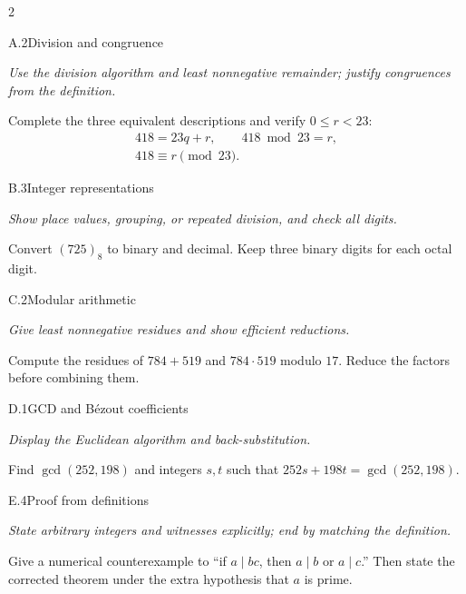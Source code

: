 \documentclass[9pt]{extarticle}
\begin{document}
\begin{multicols}{2}
\begin{CoreProblem}{A.2}{Division and congruence}
{\scriptsize\textit{Use the division algorithm and least nonnegative remainder; justify congruences from the definition.}\par}
Complete the three equivalent descriptions and verify $0\le r<23$:
\[
\begin{gathered}
418=23q+r,\qquad 418\bmod 23=r,\\
418\equiv r\pmod{23}.
\end{gathered}
\]
\end{CoreProblem}
\begin{CoreProblem}{B.3}{Integer representations}
{\scriptsize\textit{Show place values, grouping, or repeated division, and check all digits.}\par}
Convert $(725)_8$ to binary and decimal. Keep three binary digits for each
octal digit.
\end{CoreProblem}
\begin{CoreProblem}{C.2}{Modular arithmetic}
{\scriptsize\textit{Give least nonnegative residues and show efficient reductions.}\par}
Compute the residues of $784+519$ and $784\cdot519$ modulo $17$. Reduce the
factors before combining them.
\end{CoreProblem}
\columnbreak
\begin{CoreProblem}{D.1}{GCD and B\'ezout coefficients}
{\scriptsize\textit{Display the Euclidean algorithm and back-substitution.}\par}
Find $\gcd(252,198)$ and integers $s,t$ such that
$252s+198t=\gcd(252,198)$.
\end{CoreProblem}
\begin{CoreProblem}{E.4}{Proof from definitions}
{\scriptsize\textit{State arbitrary integers and witnesses explicitly; end by matching the definition.}\par}
Give a numerical counterexample to ``if $a\mid bc$, then $a\mid b$ or
$a\mid c$.'' Then state the corrected theorem under the extra hypothesis that
$a$ is prime.
\end{CoreProblem}
\end{multicols}
\CoreWorkArea
\FormBreak
{}
\end{document}
